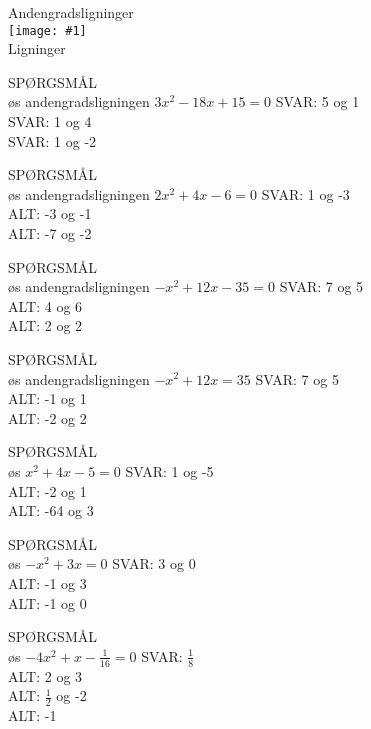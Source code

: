\documentclass[]{article}
\newcounter{spgcounter}
\newenvironment{question}[2]{\addtocounter{spgcounter}{1} SPØRGSMÅL \thespgcounter\\}{\hspace{50px}}
\newcommand{\name}[1]{{\huge #1}\\}
\newcommand{\tag}[1]{#1}
\newcommand{\cover}[1]{\texttt{[image: \#1]}\\}
\newcommand{\answer}[1]{{\color{green} SVAR: #1}\\}
\newcommand{\alt}[1]{{\color{red} ALT: #1}\\}
\begin{document}
\name{Andengradsligninger}
\cover{andengradsligninger.png}
\tag{Ligninger}

\begin{question}{multi}
Løs andengradsligningen $3x^2 -18x+15=0$
\answer{5 og 1}
\answer{1 og 4}
\answer{1 og -2}
\end{question}

\begin{question}{multi}
Løs andengradsligningen $2x^2+4x-6=0$
\answer{1 og -3}
\alt{-3 og -1}
\alt{-7 og -2}
\end{question}

\begin{question}{multi}
Løs andengradsligningen $-x^2+12x-35=0$
\answer{7 og 5}
\alt{4 og 6}
\alt{2 og 2}
\end{question}

\begin{question}{multi}
Løs andengradsligningen $-x^2+12x=35$
\answer{7 og 5}
\alt{-1 og 1}
\alt{-2 og 2}
\end{question}

\begin{question}{multi}
Løs $x^2+4x-5=0$
\answer{1 og -5}
\alt{-2 og 1}
\alt{-64 og 3}
\end{question}

\begin{question}{multi}
Løs $-x^2+3x=0$
\answer{3 og 0}
\alt{-1 og 3}
\alt{-1 og 0}
\end{question}

\begin{question}{multi}
Løs $-4x^2+x-\frac{1}{16}=0$
\answer{$\frac{1}{8}$}
\alt{2 og 3}
\alt{$\frac{1}{2}$ og -2}
\alt{-1}
\end{question}
    
\end{document}
